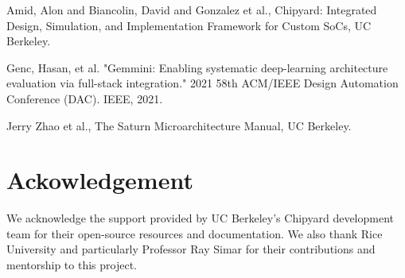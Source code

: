 \documentclass[conference]{IEEEtran}
\begin{document}
\begin{thebibliography}{00}

 Amid, Alon and Biancolin, David and Gonzalez et al., Chipyard: Integrated Design, Simulation, and Implementation Framework for Custom SoCs, UC Berkeley.

 Genc, Hasan, et al. "Gemmini: Enabling systematic deep-learning architecture evaluation via full-stack integration." 2021 58th ACM/IEEE Design Automation Conference (DAC). IEEE, 2021.

 Jerry Zhao et al., The Saturn Microarchitecture Manual, UC Berkeley.
\end{thebibliography}
\vspace{12pt}


\section{Ackowledgement}
We acknowledge the support provided by UC Berkeley’s Chipyard development team for their open-source resources and documentation. We also thank Rice University and particularly Professor Ray Simar for their contributions and mentorship to this project.
\end{document}
